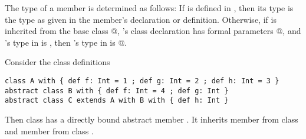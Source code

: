 \documentclass[11pt]{report}
\newcommand{\ifqualified}[1]{}
\begin{document}
The type of a member \verb@m@ is determined as follows: If \verb@m@ is defined
in \verb@stats@, then its type is the type as given in the member's
declaration or definition. Otherwise, if \verb@m@ is inherited from the
base class \verb@B[T1 \commadots T_n]@, \verb@B@'s class declaration has formal
parameters \verb@[a_1 \commadots a_n]@, and \verb@M@'s type in \verb@B@ is \verb@U@, then
\verb@M@'s type in \verb@C@ is \verb@U[a_1 := T_1
\commadots a_n := T_n]@.

\ifqualified{
Members of templates have internally qualified names $Q\qex x$ where
$x$ is a simple name and $Q$ is either the empty name $\epsilon$, or
is a qualified name referencing the module or class that first
introduces the member. A basic declaration or definition of $x$ in a
module or class $M$ introduces a member with the following qualified
name:
\begin{enumerate}
\item
If the binding is labelled with an \verb@override $Q$@\nyi{Override
  with qualifier} modifier,
where $Q$ is a fully qualified name of a base class of $M$, then the
qualified name is the qualified expansion (\sref{sec:names}) of $x$ in
$Q$.
\item
If the binding is labelled with an \verb@override@ modifier without a
base class name, then the qualified name is the qualified expansion
of $x$ in $M$'s least proper supertype (\sref{sec:templates}).
\item
An implicit \verb@override@ modifier is added and case (2) also
applies if $M$'s least proper supertype contains an abstract member
with simple name $x$.
\item
If no \verb@override@ modifier is given or implied, then if $M$ is
labelled \verb@qualified@, the qualified name is $M\qex x$. If $M$ is
not labelled \verb@qualified@, the qualified name is $\epsilon\qex x$.
\end{enumerate}
}

\example Consider the class definitions

\begin{verbatim}
class A with { def f: Int = 1 ; def g: Int = 2 ; def h: Int = 3 }
abstract class B with { def f: Int = 4 ; def g: Int }
abstract class C extends A with B with { def h: Int }
\end{verbatim}

Then class \verb@C@ has a directly bound abstract member \verb@h@. It
inherits member \verb@f@ from class \verb@B@ and member \verb@g@ from
class \verb@A@.
\end{document}
